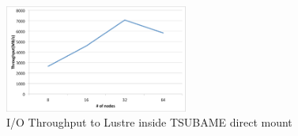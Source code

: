 
\begin{figure}[tb]
	\centering
	\includegraphics[width=6cm]{../img/throughput_tsubame}
	\caption{I/O Throughput to Lustre inside TSUBAME direct mount}
	\label{throughput TSUBAME}
\end{figure}

